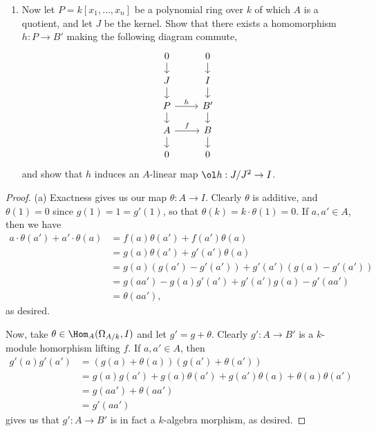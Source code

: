 \documentclass[12pt]{amsart}
\begin{document}
\begin{enumerate}
{\begin{enumerate}
        \item Now let $P=k[x_1,\ldots, x_n]$ be a polynomial ring over $k$ of which $A$ is a quotient, and let $J$ be the kernel.
          Show that there exists a homomorphism $h:P\to B'$ making the following diagram commute,
          \[
            \begin{tikzcd}[row sep = 0.4cm]
              0\ar[d]& 0\ar[d] \\
              J\ar[d]& I\ar[d] \\
              P\ar[d]\ar[r,"h"]& B'\ar[d] \\
              A\ar[d]\ar[r,"f"]& B\ar[d] \\
              0& 0
            \end{tikzcd}
          \] 
          and show that $h$ induces an $A$-linear map $\ol h:J/J^2\to I$.
      \end{enumerate}
    }
\end{enumerate}

\begin{proof}
  (a) Exactness gives us our map $\theta:A\to I$.
  Clearly $\theta$ is additive, and $\theta(1)=0$ since $g(1)=1=g'(1)$, so that $\theta(k)=k\cdot\theta(1)=0$.
  If $a,a'\in A$, then we have
  \begin{align*}
    a\cdot \theta(a') + a'\cdot \theta(a)
      &= f(a)\theta(a') + f(a')\theta(a) \\
      &= g(a)\theta(a') + g'(a')\theta(a) \\
      &= g(a)(g(a')- g'(a')) + g'(a')(g(a)-g'(a')) \\
      &= g(aa') - g(a)g'(a') + g'(a')g(a) - g'(aa') \\
      &= \theta(aa'),
  \end{align*}
  as desired.

  Now, take $\theta\in \Hom_A(\Omega_{A/k},I)$ and let $g'= g+\theta$.
  Clearly $g':A\to B'$ is a $k$-module homorphism lifting $f$.
  If $a,a'\in A$, then
  \begin{align*}
    g'(a)g'(a')
      &= (g(a) + \theta(a))(g(a')+\theta(a')) \\
      &= g(a)g(a') + g(a)\theta(a') + g(a')\theta(a) + \theta(a)\theta(a') \\
      &= g(aa') + \theta(aa') \\
      &=g'(aa')
  \end{align*}
  gives us that $g':A\to B'$ is in fact a $k$-algebra morphism, as desired.
\end{proof}
\end{document}
